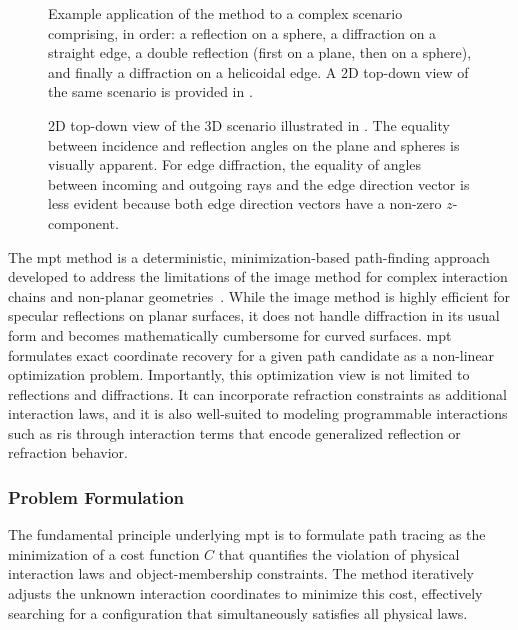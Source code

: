 \begin{figure}
  \caption{Example application of the  method to a complex scenario comprising, in order: a reflection on a sphere, a diffraction on a straight edge, a double reflection (first on a plane, then on a sphere), and finally a diffraction on a helicoidal edge. A 2D top-down view of the same scenario is provided in .}
\end{figure}

\begin{figure}
  \caption{2D top-down view of the 3D scenario illustrated in . The equality between incidence and reflection angles on the plane and spheres is visually apparent. For edge diffraction, the equality of angles between incoming and outgoing rays and the edge direction vector is less evident because both edge direction vectors have a non-zero $z$-component.}
\end{figure}

The \gls{mpt} method is a deterministic, minimization-based path-finding approach developed to address the limitations of the image method for complex interaction chains and non-planar geometries~. While the image method is highly efficient for specular reflections on planar surfaces, it does not handle diffraction in its usual form and becomes mathematically cumbersome for curved surfaces. \Gls{mpt} formulates exact coordinate recovery for a given path candidate as a non-linear optimization problem. Importantly, this optimization view is not limited to reflections and diffractions. It can incorporate refraction constraints as additional interaction laws, and it is also well-suited to modeling programmable interactions such as \gls{ris} through interaction terms that encode generalized reflection or refraction behavior.

\subsubsection{Problem Formulation}

The fundamental principle underlying \gls{mpt} is to formulate path tracing as the minimization of a cost function $C$ that quantifies the violation of physical interaction laws and object-membership constraints. The method iteratively adjusts the unknown interaction coordinates to minimize this cost, effectively searching for a configuration that simultaneously satisfies all physical laws.

